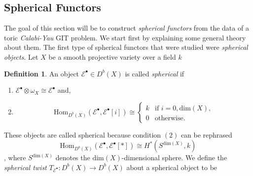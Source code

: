 \documentclass[oneside]{amsart}
\theoremstyle{definition}
\newtheorem{definition}{Definition}[section]
\theoremstyle{definition}
\theoremstyle{definition}
\theoremstyle{definition}
\newcommand{\Es}{\mathcal{E}}
\begin{document}
\subsection{Spherical Functors}
\label{CY}
The goal of this section will be to construct \textit{spherical functors} from the data of a toric \textit{Calabi-Yau} GIT problem. We start first by explaining some general theory about them. The first type of spherical functors that were studied were \textit{spherical objects}. Let $X$ be a smooth projective variety over a field $k$
\begin{definition}\cite[Chapter 8]{huybrechts}
    \label{sphericalobject}
    An object $\Es^{\bullet} \in D^b(X)$ is called \textit{spherical} if 
    \begin{enumerate}
        \item $\Es^{\bullet} \otimes \omega_X \cong \Es^{\bullet}$ and,
        \item \[
        \text{Hom}_{D^b(X)}(\Es^{\bullet},\Es^{\bullet}[i]) \cong 
        \begin{cases}
            k & \text{if } i = 0, \text{dim}(X), \\
            0 & \text{otherwise}.
        \end{cases}
        \]
    \end{enumerate}
\end{definition}
These objects are called spherical because condition $(2)$ can be rephrased
$$
\text{Hom}_{D^b(X)}(\Es^{\bullet},\Es^{\bullet}[*]) \cong H^*(S^{\text{dim}(X)},k)
$$,
where $S^{\text{dim}(X)}$ denotes the $\text{dim}(X)$-dimensional sphere. We define the \textit{spherical twist} $T_{\Es^{\bullet}} : D^b(X) \to D^b(X)$ about a spherical object to be 
\end{document}
